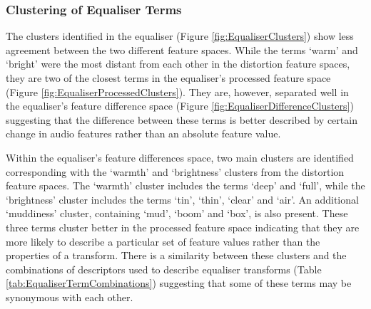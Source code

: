 		\subsubsection*{Clustering of Equaliser Terms}
			The clusters identified in the equaliser (Figure \ref{fig:EqualiserClusters}) show less agreement
			between the two different feature spaces. While the terms `warm' and `bright' were the most distant
			from each other in the distortion feature spaces, they are two of the closest terms in the
			equaliser's processed feature space (Figure \ref{fig:EqualiserProcessedClusters}). They are,
			however, separated well in the equaliser's feature difference space (Figure
			\ref{fig:EqualiserDifferenceClusters}) suggesting that the difference between these terms is better
			described by certain change in audio features rather than an absolute feature value.
			
			Within the equaliser's feature differences space, two main clusters are identified corresponding
			with the `warmth' and `brightness' clusters from the distortion feature spaces. The `warmth'
			cluster includes the terms `deep' and `full', while the `brightness' cluster includes the terms
			`tin', `thin', `clear' and `air'. An additional `muddiness' cluster, containing `mud', `boom' and
			`box', is also present. These three terms cluster better in the processed feature space indicating
			that they are more likely to describe a particular set of feature values rather than the properties
			of a transform. There is a similarity between these clusters and the combinations of descriptors
			used to describe equaliser transforms (Table \ref{tab:EqualiserTermCombinations}) suggesting that
			some of these terms may be synonymous with each other.


